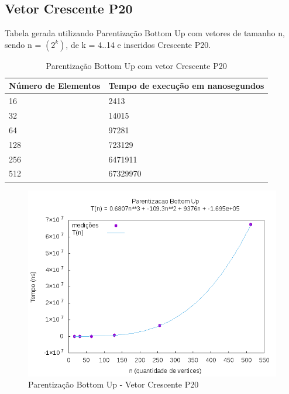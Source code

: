 \documentclass[12pt,a4paper,twoside]{report}
\begin{document}
\subsection{Vetor Crescente P20}
Tabela gerada utilizando Parentização Bottom Up com vetores de tamanho n, sendo n = $(2^k)$, de k = 4..14 e inseridos Crescente P20.
\begin{table}[H]
\centering
\caption{Parentização Bottom Up com vetor Crescente P20}
\label{my-label}
\begin{tabular}{|l|l|}
\hline
\multicolumn{1}{|c|}{\textbf{Número de Elementos}} & \multicolumn{1}{c|}{\textbf{Tempo de execução em nanosegundos}} \\ \hline
16 & 2413 \\ \hline
32 & 14015 \\ \hline
64 & 97281 \\ \hline
128 & 723129 \\ \hline
256 & 6471911 \\ \hline
512 & 67329970 \\ \hline
\end{tabular}
\end{table}

\begin{figure}[H]
    \centering
    \includegraphics[width=0.7\linewidth]{graficos/Parentizacao BottomUp/Crescente P20/ParentizacaoBottomUp.png}
  \caption{Parentização Bottom Up - Vetor Crescente P20}
\end{figure}
\end{document}

